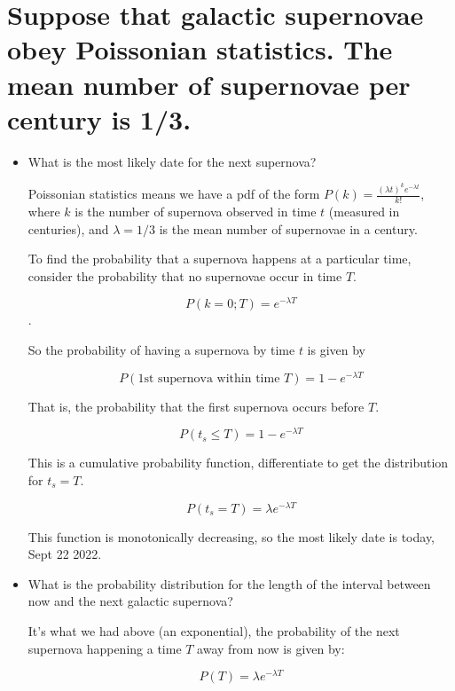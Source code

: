 \section{Suppose that galactic supernovae obey Poissonian statistics.
The mean number of supernovae per century is 1/3.}

\begin{itemize}
    \item What is the most likely date for the next supernova?

    Poissonian statistics means we have a pdf of the form
    $P(k) = \frac{(\lambda t)^k e^{-\lambda t}}{k!}$,
    where $k$ is the number of supernova observed in time $t$ (measured in centuries),
    and $\lambda = 1/3$ is the mean number of supernovae in a century.

    To find the probability that a supernova happens at a particular time, consider the probability that no supernovae occur in time $T$.

    $$P(k=0;T) = e^{-\lambda T}$$.

    So the probability of having a supernova by time $t$ is given by
    
    $$P(\text{1st supernova within time }T) = 1 - e^{-\lambda T}$$

    That is, the probability that the first supernova occurs before $T$.

    $$P(t_s \leq T) = 1 - e^{-\lambda T}$$

    This is a cumulative probability function, differentiate to get the distribution for $t_s=T$.

    $$P(t_s=T) = \lambda e^{-\lambda T}$$

    This function is monotonically decreasing, so the most likely date is today, Sept 22 2022.

    \item What is the probability distribution for the length of the interval between
    now and the next galactic supernova?

    It's what we had above (an exponential), the probability of the next supernova happening a time $T$ away from now is given by:

    $$P(T) = \lambda e^{-\lambda T}$$

\end{itemize}


